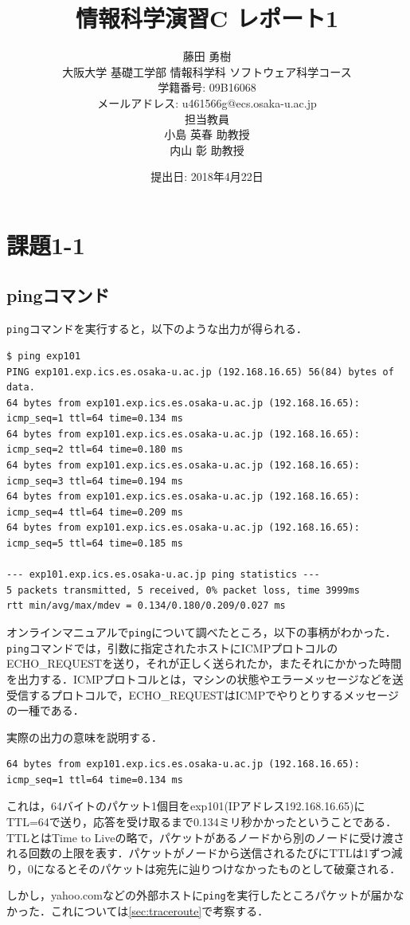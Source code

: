\documentclass[a4j,10pt,titlepage]{jsarticle}
\title{情報科学演習C レポート1}
\author{藤田 勇樹 \\
大阪大学 基礎工学部 情報科学科 ソフトウェア科学コース\\
学籍番号: 09B16068 \\
メールアドレス: u461566g@ecs.osaka-u.ac.jp \\
担当教員\\
小島 英春 助教授 \\
内山 彰 助教授}
\date{提出日: 2018年4月22日}
\begin{document}
\maketitle
\section{課題1-1}
\subsection{pingコマンド}\label{sec:ping}
\verb|ping|コマンドを実行すると，以下のような出力が得られる．
\begin{verbatim}
$ ping exp101 
PING exp101.exp.ics.es.osaka-u.ac.jp (192.168.16.65) 56(84) bytes of data.
64 bytes from exp101.exp.ics.es.osaka-u.ac.jp (192.168.16.65): icmp_seq=1 ttl=64 time=0.134 ms
64 bytes from exp101.exp.ics.es.osaka-u.ac.jp (192.168.16.65): icmp_seq=2 ttl=64 time=0.180 ms
64 bytes from exp101.exp.ics.es.osaka-u.ac.jp (192.168.16.65): icmp_seq=3 ttl=64 time=0.194 ms
64 bytes from exp101.exp.ics.es.osaka-u.ac.jp (192.168.16.65): icmp_seq=4 ttl=64 time=0.209 ms
64 bytes from exp101.exp.ics.es.osaka-u.ac.jp (192.168.16.65): icmp_seq=5 ttl=64 time=0.185 ms

--- exp101.exp.ics.es.osaka-u.ac.jp ping statistics ---
5 packets transmitted, 5 received, 0% packet loss, time 3999ms
rtt min/avg/max/mdev = 0.134/0.180/0.209/0.027 ms
\end{verbatim}

オンラインマニュアルで\verb|ping|について調べたところ，以下の事柄がわかった．\verb|ping|コマンドでは，引数に指定されたホストにICMPプロトコルのECHO\_REQUESTを送り，それが正しく送られたか，またそれにかかった時間を出力する．ICMPプロトコルとは，マシンの状態やエラーメッセージなどを送受信するプロトコルで，ECHO\_REQUESTはICMPでやりとりするメッセージの一種である．

実際の出力の意味を説明する．
\begin{verbatim}
64 bytes from exp101.exp.ics.es.osaka-u.ac.jp (192.168.16.65): icmp_seq=1 ttl=64 time=0.134 ms
\end{verbatim}
これは，64バイトのパケット1個目をexp101(IPアドレス192.168.16.65)にTTL=64で送り，応答を受け取るまで0.134ミリ秒かかったということである．TTLとはTime to Liveの略で，パケットがあるノードから別のノードに受け渡される回数の上限を表す．パケットがノードから送信されるたびにTTLは1ずつ減り，0になるとそのパケットは宛先に辿りつけなかったものとして破棄される．

しかし，yahoo.comなどの外部ホストに\verb|ping|を実行したところパケットが届かなかった．これについては\ref{sec:traceroute}で考察する．
\end{document}
